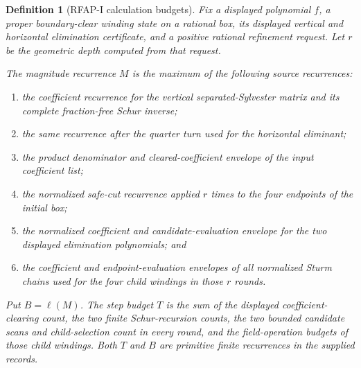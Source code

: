 \documentclass[11pt]{article}
\newtheorem{definition}[theorem]{Definition}
\begin{document}
\begin{definition}[RFAP-I calculation budgets]
\label{def:rfap-one-calculation-budgets}
Fix a displayed polynomial $f$, a proper boundary-clear winding state on a
rational box, its displayed vertical and horizontal elimination certificate,
and a positive rational refinement request.  Let $r$ be the geometric depth
computed from that request.

The magnitude recurrence $M$ is the maximum of the following source
recurrences:
\begin{enumerate}
\item the coefficient recurrence for the vertical separated-Sylvester matrix
and its complete fraction-free Schur inverse;
\item the same recurrence after the quarter turn used for the horizontal
eliminant;
\item the product denominator and cleared-coefficient envelope of the input
coefficient list;
\item the normalized safe-cut recurrence applied $r$ times to the four
endpoints of the initial box;
\item the normalized coefficient and candidate-evaluation envelope for the
two displayed elimination polynomials; and
\item the coefficient and endpoint-evaluation envelopes of all normalized
Sturm chains used for the four child windings in those $r$ rounds.
\end{enumerate}
Put $B=\ell(M)$.  The step budget $T$ is the sum of the displayed
coefficient-clearing count, the two finite Schur-recursion counts, the two
bounded candidate scans and child-selection count in every round, and the
field-operation budgets of those child windings.  Both $T$ and $B$ are
primitive finite recurrences in the supplied records.
\end{definition}
\end{document}

